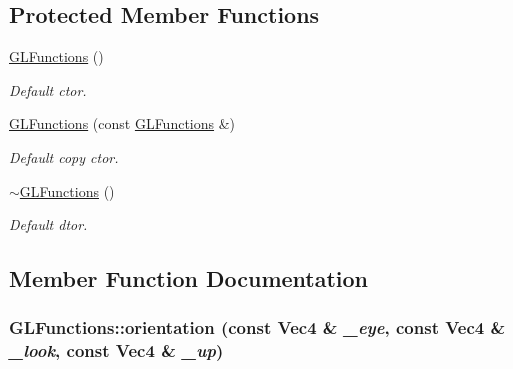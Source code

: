 \subsection*{Protected Member Functions}
\begin{DoxyCompactItemize}
\item 
\hypertarget{classGLFunctions_a7115ed642d23e01b54d00a09da3c8ef3}{
\hyperlink{classGLFunctions_a7115ed642d23e01b54d00a09da3c8ef3}{GLFunctions} ()}
\label{classGLFunctions_a7115ed642d23e01b54d00a09da3c8ef3}

\begin{DoxyCompactList}\small\item\em Default ctor. \item\end{DoxyCompactList}\item 
\hypertarget{classGLFunctions_a09aea45a6200abad5aaa4bd2e2609a54}{
\hyperlink{classGLFunctions_a09aea45a6200abad5aaa4bd2e2609a54}{GLFunctions} (const \hyperlink{classGLFunctions}{GLFunctions} \&)}
\label{classGLFunctions_a09aea45a6200abad5aaa4bd2e2609a54}

\begin{DoxyCompactList}\small\item\em Default copy ctor. \item\end{DoxyCompactList}\item 
\hypertarget{classGLFunctions_a1f5320ef521dcd81ba168bc2bbd3259b}{
\hyperlink{classGLFunctions_a1f5320ef521dcd81ba168bc2bbd3259b}{$\sim$GLFunctions} ()}
\label{classGLFunctions_a1f5320ef521dcd81ba168bc2bbd3259b}

\begin{DoxyCompactList}\small\item\em Default dtor. \item\end{DoxyCompactList}\end{DoxyCompactItemize}


\subsection{Member Function Documentation}
\hypertarget{classGLFunctions_ad495c3d29a2c1215a57817cf57d25f73}{
\subsubsection[{orientation}]{ GLFunctions::orientation (const {\bf Vec4} \& {\em \_\-eye}, \/  const {\bf Vec4} \& {\em \_\-look}, \/  const {\bf Vec4} \& {\em \_\-up})}}
\label{classGLFunctions_ad495c3d29a2c1215a57817cf57d25f73}


